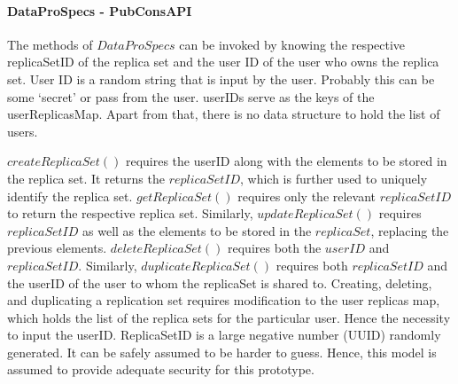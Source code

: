 \documentclass[conference]{IEEEtran}
\begin{document}
\paragraph*{DataProSpecs - PubConsAPI}
The methods of $DataProSpecs$ can be invoked by knowing the respective replicaSetID of the replica set and the user ID of the user who owns the replica set. User ID is a random string that is input by the user. Probably this can be some `secret' or pass from the user. userIDs serve as the keys of the userReplicasMap. Apart from that, there is no data structure to hold the list of users.

$createReplicaSet()$ requires the userID along with the elements to be stored in the replica set. It returns the $replicaSetID$, which is further used to uniquely identify the replica set. $getReplicaSet()$ requires only the relevant $replicaSetID$ to return the respective replica set. Similarly, $updateReplicaSet()$ requires $replicaSetID$ as well as the elements to be stored in the $replicaSet$, replacing the previous elements. $deleteReplicaSet()$ requires both the $userID$ and $replicaSetID$. Similarly, $duplicateReplicaSet()$ requires both $replicaSetID$ and the userID of the user to whom the replicaSet is shared to. Creating, deleting, and duplicating a replication set requires modification to the user replicas map, which holds the list of the replica sets for the particular user. Hence the necessity to input the userID. ReplicaSetID is a large negative number (UUID) randomly generated. It can be safely assumed to be harder to guess. Hence, this model is assumed to provide adequate security for this prototype.
\end{document}
